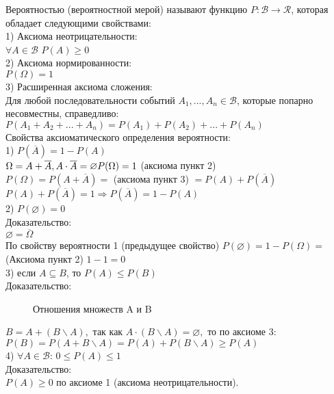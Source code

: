 Вероятностью (вероятностной мерой) называют функцию $P : \mathcal{B} \rightarrow \mathcal{R}$, которая обладает следующими свойствами:\\
1) Аксиома неотрицательности:\\
$\forall A \in \mathcal{B}$  $P(A) \geqslant 0$\\
2) Аксиома нормированности:\\
$P(\Omega) = 1$\\
3) Расширенная аксиома сложения:\\
Для любой последовательности событий $A_{1}, ..., A_{n} \in \mathcal{B}$, которые попарно несовместны, справедливо:\\
$P(A_{1} + A_{2} + ... + A_{n}) = P(A_{1}) + P(A_{2}) + ... + P(A_{n})$\\

Свойства аксиоматического определения вероятности:\\
1) $P(\overline{A}) = 1 - P(A)$\\
$\Omega = A + \overline{A}, A \cdot \overline{A} = \varnothing\\
P(\Omega) = 1 $  (аксиома пункт 2)\\
$P(\Omega) = P(A + \overline{A}) = $ (аксиома пункт 3) $ = P(A) + P(\overline{A})$\\
$P(A) + P(\overline{A}) = 1 \Rightarrow P(\overline{A}) = 1 - P(A)$\\
2) $P(\varnothing) = 0$\\
Доказательство:\\
$\varnothing = \overline{\Omega}$\\
По свойству вероятности 1 (предыдущее свойство) $P(\varnothing) = 1 - P(\Omega) = $ (Аксиома пункт 2) $ 1 - 1 = 0 $\\
3) если $A \subseteq B$, то $P(A) \leqslant P(B)$\\
Доказательство:\\
\begin{figure}[H]
	\caption{Отношения множеств A и B}
\end{figure}
$ B = A + (B \backslash A), $ так как $ A \cdot (B \backslash A) = \varnothing, $ то по аксиоме 3: $ P(B) = P(A + B \backslash A) = P(A) + P(B \backslash A) \geqslant P(A) $\\
4) $\forall A \in \mathcal{B}$: $0 \leqslant P(A) \leqslant 1$\\
Доказательство:\\
$P(A) \geqslant 0$ по аксиоме 1 (аксиома неотрицательности).\\
